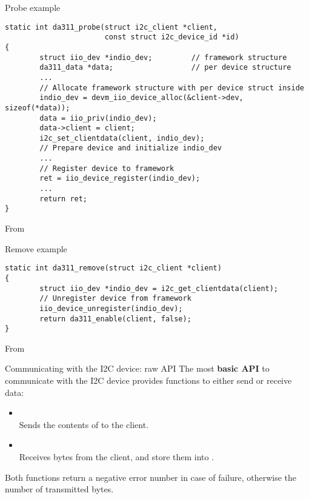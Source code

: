 \begin{frame}[fragile]{Probe example}
  \begin{block}{}
    \begin{verbatim}
static int da311_probe(struct i2c_client *client,
                       const struct i2c_device_id *id)
{
        struct iio_dev *indio_dev;         // framework structure
        da311_data *data;                  // per device structure
        ...
        // Allocate framework structure with per device struct inside
        indio_dev = devm_iio_device_alloc(&client->dev, sizeof(*data));
        data = iio_priv(indio_dev);
        data->client = client;
        i2c_set_clientdata(client, indio_dev);
        // Prepare device and initialize indio_dev
        ...
        // Register device to framework
        ret = iio_device_register(indio_dev);
        ...
        return ret;
}
    \end{verbatim}
  \end{block}
  From 
\end{frame}

\begin{frame}[fragile]{Remove example}
  \begin{block}{}
    \begin{verbatim}
static int da311_remove(struct i2c_client *client)
{
        struct iio_dev *indio_dev = i2c_get_clientdata(client);
        // Unregister device from framework
        iio_device_unregister(indio_dev);
        return da311_enable(client, false);
}
    \end{verbatim}
  \end{block}
  From 
\end{frame}

\begin{frame}{Communicating with the I2C device: raw API}
  The most {\bf basic API} to communicate with the I2C device provides
  functions to either send or receive data:
  \begin{itemize}
  \item
    \\Sends the contents of  to the client.
  \item
    \\Receives {} bytes from the client, and store them into
    .
  \end{itemize}
  Both functions return a negative error number in case of failure, otherwise the
  number of transmitted bytes.
\end{frame}

